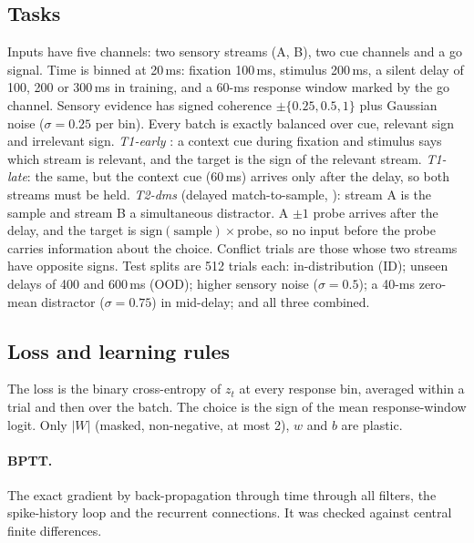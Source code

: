 \subsection{Tasks}
Inputs have five channels: two sensory streams (A, B), two cue channels and a go signal. Time is
binned at 20\,ms: fixation 100\,ms, stimulus 200\,ms, a silent delay of 100, 200 or 300\,ms in
training, and a 60-ms response window marked by the go channel. Sensory evidence has signed
coherence $\pm\{0.25,0.5,1\}$ plus Gaussian noise ($\sigma=0.25$ per bin). Every batch is exactly
balanced over cue, relevant sign and irrelevant sign.
\emph{T1-early} \citep[context-dependent decision;][]{mante2013}: a context cue during fixation and
stimulus says which stream is relevant, and the target is the sign of the relevant stream.
\emph{T1-late}: the same, but the context cue (60\,ms) arrives only after the delay, so both
streams must be held. \emph{T2-dms} (delayed match-to-sample, \citealp{miller1996,masse2019}):
stream A is the sample and stream B a simultaneous distractor. A $\pm1$ probe arrives after the
delay, and the target is $\mathrm{sign(sample)}\times\mathrm{probe}$, so no input before the probe
carries information about the choice. Conflict trials are those whose two streams have opposite
signs. Test splits are 512 trials each: in-distribution (ID); unseen delays of 400 and 600\,ms
(OOD); higher sensory noise ($\sigma=0.5$); a 40-ms zero-mean distractor ($\sigma=0.75$) in
mid-delay; and all three combined.

\subsection{Loss and learning rules}
The loss is the binary cross-entropy of $z_t$ at every response bin, averaged within a trial and
then over the batch. The choice is the sign of the mean response-window logit. Only $|W|$ (masked,
non-negative, at most 2), $w$ and $b$ are plastic.

\paragraph{BPTT.} The exact gradient by back-propagation through time \citep{werbos1990bptt}
through all filters, the spike-history loop and the recurrent connections. It was checked against
central finite differences.

